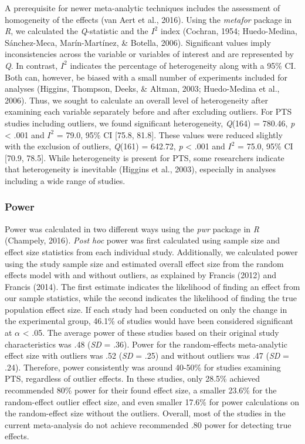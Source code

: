 \documentclass[,man]{apa6}
\begin{document}
A prerequisite for newer meta-analytic techniques includes the assessment of homogeneity of the effects (van Aert et al., 2016). Using the \emph{metafor} package in \emph{R}, we calculated the \emph{Q}-statistic and the \(I^2\) index (Cochran, 1954; Huedo-Medina, Sánchez-Meca, Marín-Martínez, \& Botella, 2006). Significant values imply inconsistencies across the variable or variables of interest and are represented by \emph{Q}. In contrast, \(I^2\) indicates the percentage of heterogeneity along with a 95\% CI. Both can, however, be biased with a small number of experiments included for analyses (Higgins, Thompson, Deeks, \& Altman, 2003; Huedo-Medina et al., 2006). Thus, we sought to calculate an overall level of heterogeneity after examining each variable separately before and after excluding outliers. For PTS studies including outliers, we found significant heterogeneity, \emph{Q}(164) = 780.46, \emph{p} \textless{} .001 and \(I^2\) = 79.0, 95\% CI {[}75.8, 81.8{]}. These values were reduced slightly with the exclusion of outliers, \emph{Q}(161) = 642.72, \emph{p} \textless{} .001 and \(I^2\) = 75.0, 95\% CI {[}70.9, 78.5{]}. While heterogeneity is present for PTS, some researchers indicate that heterogeneity is inevitable (Higgins et al., 2003), especially in analyses including a wide range of studies.

\hypertarget{power}{%
\subsubsection{Power}\label{power}}

Power was calculated in two different ways using the \emph{pwr} package in \emph{R} (Champely, 2016). \emph{Post hoc} power was first calculated using sample size and effect size statistics from each individual study. Additionally, we calculated power using the study sample size and estimated overall effect size from the random effects model with and without outliers, as explained by Francis (2012) and Francis (2014). The first estimate indicates the likelihood of finding an effect from our sample statistics, while the second indicates the likelihood of finding the true population effect size. If each study had been conducted on only the change in the experimental group, 46.1\% of studies would have been considered significant at \(\alpha\) \textless{} .05. The average power of these studies based on their original study characteristics was .48 (\emph{SD} = .36). Power for the random-effects meta-analytic effect size with outliers was .52 (\emph{SD} = .25) and without outliers was .47 (\emph{SD} = .24). Therefore, power consistently was around 40-50\% for studies examining PTS, regardless of outlier effects. In these studies, only 28.5\% achieved recommended 80\% power for their found effect size, a smaller 23.6\% for the random-effect outlier effect size, and even smaller 17.6\% for power calculations on the random-effect size without the outliers. Overall, most of the studies in the current meta-analysis do not achieve recommended .80 power for detecting true effects.
\end{document}
